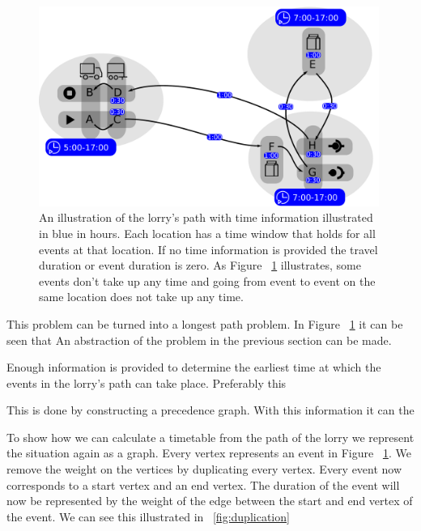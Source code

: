 \begin{figure}[!h]
  \centering
    \includegraphics[width=0.99\textwidth]{img/example_with_time_v2.pdf}
  \caption{An illustration of the lorry's path with time information illustrated in blue in hours. Each location has a time window that holds for all events at that location.
 If no time information is provided the travel duration or event duration is zero.
 As Figure ~\ref{fig:graph_time} illustrates, some events don't take up any time and going from event to event on the same location does not take up any time.
   }
  \label{fig:graph_time}
\end{figure}


This problem can be turned into a longest path problem.
In Figure ~\ref{fig:graph_time} it can be seen that
An abstraction of the problem  in the previous section can be made.

Enough information is provided to determine the earliest time at which the events in the lorry's path can take place.
Preferably this

This is done by constructing a precedence graph.
With this information it can the

To show how we can calculate a timetable from the path of the lorry we represent the situation again as a graph.
Every vertex represents an event in Figure ~\ref{fig:graph_time}.
We remove the weight on the vertices by duplicating every vertex.
Every event now corresponds to a start vertex and an end vertex.
The duration of the event will now be represented by the weight of the edge between the start and end vertex of the event. We can see this illustrated in ~\ref{fig:duplication}



